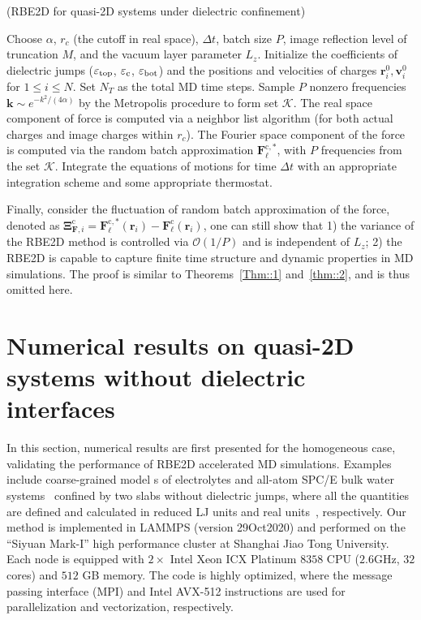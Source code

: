 \begin{algorithm}[H]
 \caption{(RBE2D for quasi-2D systems under dielectric confinement)}\label{alg::RBEalg}
 \begin{algorithmic}[1]
  \State Choose $\alpha$, $r_c$ (the cutoff in real space), $\Delta t$, batch size $P$, image reflection level of truncation $M$, and the vacuum layer parameter $L_z$. Initialize the coefficients of dielectric jumps ($\varepsilon_{\rm{top}}$, $\varepsilon_{\rm{c}}$, $\varepsilon_{\rm{bot}}$) and the positions and velocities of charges $\bm{r}^0_i, \bm{v}^0_i$ for $1\le i\le N$. Set $N_T$ as the total MD time steps.
  \State Sample $P$ nonzero frequencies $\bm{k}\sim e^{-k^2/(4\alpha)}$ by the Metropolis procedure to form set $\mathcal{K}$.
  \State The real space component of force is computed via a neighbor list algorithm (for both actual charges and image charges within $r_c$).
  \State The Fourier space component of  {the} force is computed via the random batch approximation $\bm{F}_{\ell}^{\text{c},*}$, with $P$ frequencies from the set $\mathcal{K}$.
  \State Integrate the equations of motions for time $\Delta t$ with  {an} appropriate integration scheme and some appropriate thermostat. 
  \EndFor
 \end{algorithmic}
\end{algorithm}

Finally, consider the fluctuation of random batch approximation of the force, denoted as $\bm{\Xi}_{\bm{F},i}^{\text{c}}=\bm{F}_{\ell}^{\text{c},*}(\bm{r}_i)-\bm{F}_{\ell}^{\text{c}}(\bm{r}_i)$, one can still show that 1) the variance of the RBE2D method is controlled via $\mathcal{O}(1/P)$ and is independent of $L_z$; 2) the RBE2D is capable to capture finite time structure and dynamic properties in MD simulations. 
The proof is similar to Theorems~\ref{Thm::1} and~\ref{thm::2}, and is thus omitted here.

\section{Numerical results on quasi-2D systems without dielectric interfaces}\label{sec::numerical}

In this section, numerical results are first presented for the homogeneous case, validating the performance of RBE2D accelerated MD simulations. 
Examples include coarse-grained model {s} of electrolytes and all-atom SPC/E bulk water systems~\cite{berendsen1987missing} confined by two slabs without dielectric jumps,  {where all the quantities are defined and calculated in reduced LJ units and real units~\cite{frenkel2023understanding}, respectively.}
Our method is implemented in LAMMPS (version 29Oct2020) \cite{thompson2021lammps} and performed on the ``Siyuan Mark-I'' high performance cluster at Shanghai Jiao Tong University. 
Each node is equipped with $2\times$ Intel Xeon ICX Platinum $8358$ CPU ($2.6$GHz, $32$ cores) and $512$ GB memory.
The code is highly optimized, where  {the} message passing interface (MPI) and Intel AVX-512 instructions are used for parallelization and vectorization, respectively.

